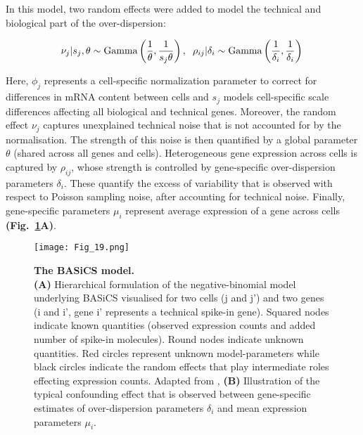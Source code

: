 In this model, two random effects were added to model the technical and biological part of the over-dispersion:

\begin{equation} 
\nu_j|s_j,\theta \sim \textnormal{Gamma}\left(\frac{1}{\theta},\frac{1}{s_j\theta}\right), \hspace{0.2cm} \rho_{ij}|\delta_i  \sim \textnormal{Gamma}\left(\frac{1}{\delta_i},\frac{1}{\delta_i}\right)\\
\end{equation} 

Here, $\phi_j$ represents a cell-specific normalization parameter to correct for differences in mRNA content between cells and $s_j$ models cell-specific scale differences affecting all biological and technical genes. Moreover, the random effect $\nu_j$ captures unexplained technical noise that is not accounted for by the normalisation. The strength of this noise is then quantified by a global parameter $\theta$ (shared across all genes and cells). Heterogeneous gene expression across cells is captured by $\rho_{ij}$, whose strength is controlled by gene-specific over-dispersion parameters $\delta_i$. These quantify the excess of variability that is observed with respect to Poisson sampling noise, after accounting for technical noise. Finally, gene-specific parameters $\mu_i$ represent average expression of a gene across cells \textbf{(Fig.~\ref{fig0:BASiCS}A)}. 

\newpage

\begin{figure}[!h]
\centering
\texttt{[image: Fig\_19.png]}
\caption[The BASiCS model]{\textbf{The BASiCS model.}\\
\textbf{(A)} Hierarchical formulation of the negative-binomial model underlying BASiCS visualised for two cells (j and j') and two genes (i and i', gene i' represents a technical spike-in gene). Squared nodes indicate known quantities (observed expression counts and added number of spike-in molecules). Round nodes indicate unknown quantities. Red circles represent unknown model-parameters while black circles indicate the random effects that play intermediate roles effecting expression counts. Adapted from \citep{Vallejos2015BASiCS}, \textbf{(B)} Illustration of the typical confounding effect that is observed between gene-specific estimates of over-dispersion parameters $\delta_i$ and mean expression parameters $\mu_i$.}
\label{fig0:BASiCS}
\end{figure}

